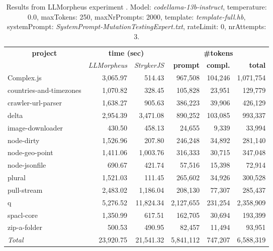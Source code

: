 
\begin{table*}[hbt!]
\centering
{\scriptsize
\begin{tabular}{l||r|r|r|r|r}
\multicolumn{1}{c|}{\bf project} & \multicolumn{2}{|c|}{\bf time (sec)} & \multicolumn{3}{|c|}{\bf \#tokens} \\
               & {\it LLMorpheus} & {\it StrykerJS} & {\bf prompt} & {\bf compl.} & {\bf total} \\
\hline
  Complex.js & 3,065.97 & 514.43 & 967,508 & 104,246 & 1,071,754 \\ 
countries-and-timezones & 1,070.82 & 328.45 & 105,828 & 23,951 & 129,779 \\ 
crawler-url-parser & 1,638.27 & 905.63 & 386,223 & 39,906 & 426,129 \\ 
delta & 2,954.39 & 3,471.08 & 890,252 & 103,085 & 993,337 \\ 
image-downloader & 430.50 & 458.13 & 24,655 & 9,339 & 33,994 \\ 
node-dirty & 1,526.96 & 207.80 & 246,248 & 34,892 & 281,140 \\ 
node-geo-point & 1,411.06 & 1,003.76 & 316,333 & 30,715 & 347,048 \\ 
node-jsonfile & 690.67 & 421.74 & 57,516 & 15,398 & 72,914 \\ 
plural & 1,521.03 & 111.45 & 265,602 & 34,926 & 300,528 \\ 
pull-stream & 2,483.02 & 1,186.04 & 208,130 & 77,307 & 285,437 \\ 
q & 5,276.52 & 11,824.34 & 2,127,655 & 231,254 & 2,358,909 \\ 
spacl-core & 1,350.99 & 617.51 & 162,705 & 30,694 & 193,399 \\ 
zip-a-folder & 500.53 & 490.95 & 82,457 & 11,494 & 93,951 \\ 
\hline
  \textit{Total} & 23,920.75 & 21,541.32 & 5,841,112 & 747,207 & 6,588,319 \\
  \end{tabular}
  }
  \\[2mm]
  \caption{Results from LLMorpheus experiment .
    Model: \textit{codellama-13b-instruct}, 
    temperature: 0.0, 
    maxTokens: 250, 
    maxNrPrompts: 2000, 
    template: \textit{template-full.hb}, 
    systemPrompt: \textit{SystemPrompt-MutationTestingExpert.txt}, 
    rateLimit: 0, 
    nrAttempts: 3.  
  }
  \label{table:Cost:run359:codellama-13b-instruct:template-full.hb:0.0}
\end{table*}